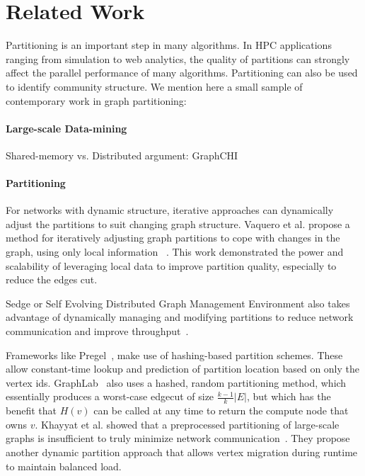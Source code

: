 \section{Related Work}
Partitioning is an important step in many algorithms. In HPC applications ranging from simulation to web analytics, the quality of partitions can strongly affect the parallel performance of many algorithms. Partitioning can also be used to identify community structure. We mention here a small sample of contemporary work in graph partitioning:

\paragraph{Large-scale Data-mining}
Shared-memory vs. Distributed argument: GraphCHI~\cite{graphchi}

\paragraph{Partitioning}

For networks with dynamic structure, iterative approaches can dynamically adjust the partitions to suit changing graph structure.
Vaquero et al. propose a method for iteratively adjusting graph partitions to cope with changes in the graph, using only local information ~\cite{Vaquero:2013:APL:2523616.2525943}.
This work demonstrated the power and scalability of leveraging local data to improve partition quality, especially to reduce the edges cut.

Sedge or Self Evolving Distributed Graph Management Environment also takes advantage of dynamically managing and modifying partitions to reduce network communication and improve throughput~\cite{Yangpart}.

Frameworks like Pregel~\cite{Malpregel}, make use of hashing-based partition schemes.
These allow constant-time lookup and prediction of partition location based on only the vertex ids.
GraphLab~\cite{Low:2012:DGF:2212351.2212354} also uses a hashed, random partitioning method, which essentially produces a worst-case edgecut of size $\frac{k-1}{k}|E|$, but which has the benefit that $H(v)$ can be called at any time to return the compute node that owns $v$.  
Khayyat et al. showed that a preprocessed partitioning of large-scale graphs is insufficient to truly minimize network communication~\cite{khayyatmizan}.
They propose another dynamic partition approach that allows vertex migration during runtime to maintain balanced load.

